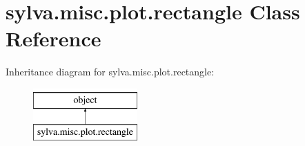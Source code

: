 \hypertarget{classsylva_1_1misc_1_1plot_1_1rectangle}{}\section{sylva.\+misc.\+plot.\+rectangle Class Reference}
\label{classsylva_1_1misc_1_1plot_1_1rectangle}
Inheritance diagram for sylva.\+misc.\+plot.\+rectangle\+:\begin{figure}[H]
\begin{center}
\leavevmode
\includegraphics[height=2.000000cm]{classsylva_1_1misc_1_1plot_1_1rectangle}
\end{center}
\end{figure}
